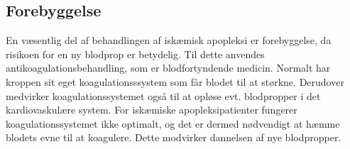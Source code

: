 \subsection{Forebyggelse}
En væsentlig del af behandlingen af iskæmisk apopleksi er forebyggelse, da risikoen for en ny blodprop er betydelig. Til dette anvendes antikoagulationsbehandling, som er blodfortyndende medicin. Normalt har kroppen sit eget koagulationsssystem som får blodet til at størkne. Derudover medvirker koagulationssystemet også til at opløse evt. blodpropper i det kardiovaskulære system. For iskæmiske apopleksipatienter fungerer koagulationssystemet ikke optimalt, og det er dermed nødvendigt at hæmme blodets evne til at koagulere. Dette modvirker dannelsen af nye blodpropper. \cite{Kjaergaard2015}



%





